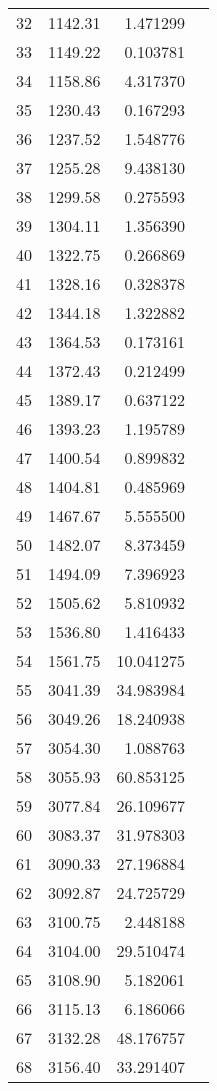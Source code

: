\begin{tabular}{r|rr|l}
32 &     1142.31 &  1.471299  & \\
33 &     1149.22 &  0.103781  & \\
34 &     1158.86 &  4.317370  & \\
35 &     1230.43 &  0.167293  & \\
36 &     1237.52 &  1.548776  & \\
37 &     1255.28 &  9.438130  & \\
38 &     1299.58 &  0.275593  & \\
39 &     1304.11 &  1.356390  & \\
40 &     1322.75 &  0.266869  & \\
41 &     1328.16 &  0.328378  & \\
42 &     1344.18 &  1.322882  & \\
43 &     1364.53 &  0.173161  & \\
44 &     1372.43 &  0.212499  & \\
45 &     1389.17 &  0.637122  & \\
46 &     1393.23 &  1.195789  & \\
47 &     1400.54 &  0.899832  & \\
48 &     1404.81 &  0.485969  & \\
49 &     1467.67 &  5.555500  & \\
50 &     1482.07 &  8.373459  & \\
51 &     1494.09 &  7.396923  & \\
52 &     1505.62 &  5.810932  & \\
53 &     1536.80 &  1.416433  & \\
54 &     1561.75 & 10.041275  & \\
55 &     3041.39 & 34.983984  & \\
56 &     3049.26 & 18.240938  & \\
57 &     3054.30 &  1.088763  & \\
58 &     3055.93 & 60.853125  & \\
59 &     3077.84 & 26.109677  & \\
60 &     3083.37 & 31.978303  & \\
61 &     3090.33 & 27.196884  & \\
62 &     3092.87 & 24.725729  & \\
63 &     3100.75 &  2.448188  & \\
64 &     3104.00 &  29.510474  & \\
65 &     3108.90 &   5.182061  & \\
66 &     3115.13 &   6.186066  & \\
67 &     3132.28 &  48.176757  & \\
68 &     3156.40 &  33.291407  & \\
  \bottomrule
\end{tabular}

